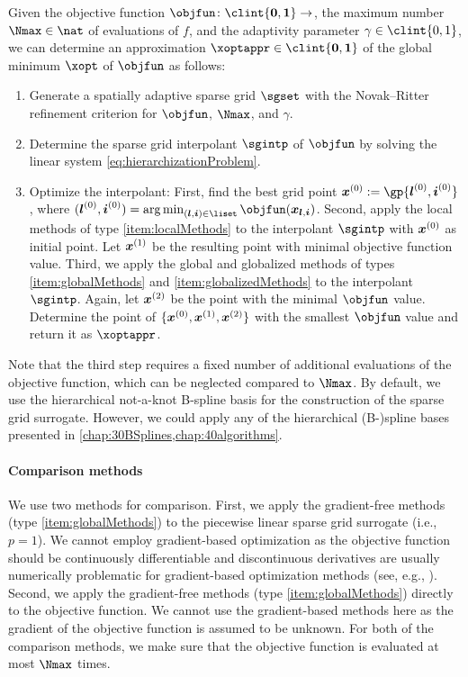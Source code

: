 Given the objective function $\objfun\colon \clint{\*0, \*1} \to \real$,
the maximum number $\Nmax \in \nat$ of evaluations of $f$, and
the adaptivity parameter $\gamma \in \clint{0, 1}$,
we can determine an approximation $\xoptappr \in \clint{\*0, \*1}$
of the global minimum $\xopt$ of $\objfun$ as follows:
\begin{enumerate}
  \item
  Generate a spatially adaptive sparse grid $\sgset$
  with the Novak--Ritter refinement criterion
  for $\objfun$, $\Nmax$, and $\gamma$.
  
  \item
  Determine the sparse grid interpolant $\sgintp$ of $\objfun$
  by solving the linear system \eqref{eq:hierarchizationProblem}.
  
  \item
  Optimize the interpolant:
  First, find the best grid point $\*x^{(0)} := \gp{\*l^{(0)},\*i^{(0)}}$,
  where $(\*l^{(0)},\*i^{(0)})
  = \argmin_{(\*l,\*i) \in \liset} \objfun(\*x_{\*l,\*i})$.
  Second, apply the local methods of type \ref{item:localMethods}
  to the interpolant $\sgintp$ with ${\boldsymbol{x}}^{(0)}$ as initial point.
  Let ${\boldsymbol{x}}^{(1)}$ be the resulting point with minimal objective function value.
  Third, we apply the global and globalized methods
  of types \ref{item:globalMethods} and \ref{item:globalizedMethods}
  to the interpolant $\sgintp$.
  Again, let ${\boldsymbol{x}}^{(2)}$ be the point with the
  minimal $\objfun$ value.
  Determine the point of $\{{\boldsymbol{x}}^{(0)}, {\boldsymbol{x}}^{(1)}, {\boldsymbol{x}}^{(2)}\}$
  with the smallest $\objfun$ value and return it as $\xoptappr$.
\end{enumerate}

Note that the third step requires a fixed number of additional
evaluations of the objective function,
which can be neglected compared to $\Nmax$.
By default, we use the hierarchical not-a-knot B-spline basis for
the construction of the sparse grid surrogate.
However, we could apply any of the hierarchical (B-)spline bases presented in
\cref{chap:30BSplines,chap:40algorithms}.

\paragraph{Comparison methods}

We use two methods for comparison.
First, we apply the gradient-free methods
(type \ref{item:globalMethods}) to the piecewise linear sparse grid surrogate
(i.e., $p = 1$).
We cannot employ gradient-based optimization as the objective function
should be continuously differentiable and
discontinuous derivatives are usually numerically problematic
for gradient-based optimization methods
(see, e.g., \cite{Huebner14Mehrdimensionale}).
Second, we apply the gradient-free methods
(type \ref{item:globalMethods}) directly to the objective function.
We cannot use the gradient-based methods here as the gradient of the
objective function is assumed to be unknown.
For both of the comparison methods,
we make sure that the objective function is evaluated at most $\Nmax$ times.

